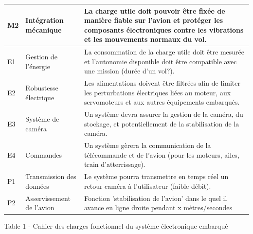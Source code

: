 \documentclass[11pt,a4paper]{article}
\begin{document}
\begin{longtable}{|p{1cm}|p{3cm}|p{\dimexpr\textwidth-1cm-3cm-4\tabcolsep-4\arrayrulewidth\relax}|}
M2 & Intégration mécanique &
La charge utile doit pouvoir être fixée de manière fiable sur l'avion et protéger les composants électroniques contre les vibrations et les mouvements normaux du vol. \\ \hline

E1 & Gestion de l'énergie &
La consommation de la charge utile doit être mesurée et l'autonomie disponible doit être compatible avec une mission (durée d'un vol?). \\ \hline

E2 & Robustesse électrique &
Les alimentations doivent être filtrées afin de limiter les perturbations électriques liées au moteur, aux servomoteurs et aux autres équipements embarqués. \\ \hline

E3 & Système de caméra &
Un système  devra assurer la gestion de la caméra, du stockage, et potentiellement de la stabilisation de la caméra. \\ \hline

E4 & Commandes &
Un système gèrera la communication de la télécommande et de l'avion (pour les moteurs, ailes, train d'atterrissage). \\ \hline

P1 & Transmission des données &
Le système pourra transmettre en temps réel un retour caméra à l'utilisateur (faible débit).\\ \hline

P2 & Asservissement de l'avion &
Fonction 'stabilisation de l'avion' dans le quel il avance en ligne droite pendant x mètres/secondes \\ \hline

\end{longtable}

\begin{center}
Table 1 - Cahier des charges fonctionnel du système électronique embarqué
\end{center}
\end{document}
